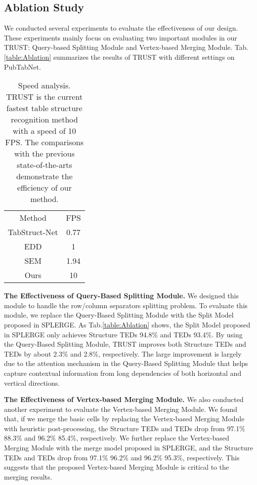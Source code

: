 \documentclass[lettersize,journal]{IEEEtran}
\begin{document}
\subsection{Ablation Study}
We conducted several experiments to evaluate the effectiveness of our design. These experiments mainly focus on evaluating two important modules in our TRUST: Query-based Splitting Module and Vertex-based Merging Module. Tab.\ref{table:Ablation} summarizes the results of TRUST with different settings on PubTabNet. 

\setlength{\tabcolsep}{4pt}
\begin{table}
\begin{center}
\caption{Speed analysis. TRUST is the current fastest table structure recognition method with a speed of 10 FPS. The comparisons with the previous state-of-the-arts demonstrate the efficiency of our method.}
\label{table:speed}
\begin{tabular}{cc}
\hline\noalign{\smallskip}
Method  & FPS\\
\noalign{\smallskip}
\hline
\noalign{\smallskip}
TabStruct-Net\cite{raja2020table}   & 0.77 \\
EDD\cite{zhong2020image}   & 1 \\
SEM\cite{zhang2022split}   & 1.94 \\
\hline
Ours & 10 \\
\hline
\end{tabular}
\end{center}
\end{table}
\setlength{\tabcolsep}{1.4pt}

\textbf{The Effectiveness of Query-Based Splitting Module.} We designed this module to handle the row/column separators splitting problem. To evaluate this module, we replace the Query-Based Splitting Module with the Split Model proposed in SPLERGE\cite{tensmeyer2019deep}. As Tab.\ref{table:Ablation} shows, the Split Model proposed in SPLERGE only achieves Structure TEDs 94.8\% and TEDs 93.4\%. By using the Query-Based Splitting Module, TRUST improves both Structure TEDs and TEDs by about 2.3\% and 2.8\%, respectively. The large improvement is largely due to the attention mechanism in the Query-Based Splitting Module that helps capture contextual information from long dependencies of both horizontal and vertical directions.

\textbf{The Effectiveness of Vertex-based Merging Module.} We also conducted another experiment to evaluate the Vertex-based Merging Module. We found that, if we merge the basic cells by replacing the Vertex-based Merging Module with heuristic post-processing, the Structure TEDs and TEDs drop from 97.1\%  88.3\% and 96.2\%  85.4\%, respectively. We further replace the Vertex-based Merging Module with the merge model proposed in SPLERGE, and the Structure TEDs and TEDs drop from 97.1\%  96.2\% and 96.2\%  95.3\%, respectively. This suggests that the proposed  Vertex-based Merging Module is critical to the merging results.
\end{document}
